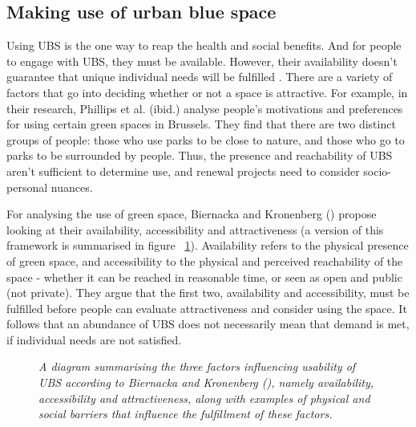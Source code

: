 \documentclass{article}
\begin{document}
\subsection{Making use of urban blue space}

Using UBS is the one way to reap the health and social benefits. And for people to engage with UBS, they must be available. However, their availability doesn't guarantee that unique individual needs will be fulfilled \parencite{phillips2021use}. There are a variety of factors that go into deciding whether or not a space is attractive. For example, in their research, Phillips et al. (ibid.) analyse people's motivations and preferences for using certain green spaces in Brussels. They find that there are two distinct groups of people: those who use parks to be close to nature, and those who go to parks to be surrounded by people. Thus, the presence and reachability of UBS aren't sufficient to determine use, and renewal projects need to consider socio-personal nuances.

For analysing the use of green space, Biernacka and Kronenberg (\citeyear{biernacka2018classification}) propose looking at their availability, accessibility and attractiveness (a version of this framework is summarised in figure ~\ref{fig:diagram_ubs_use}).
Availability refers to the physical presence of green space, and accessibility to the physical and perceived reachability of the space - whether it can be reached in reasonable time, or seen as open and public (not private). 
They argue that the first two, availability and accessibility, must be fulfilled before people can evaluate attractiveness and consider using the space. 
It follows that an abundance of UBS does not necessarily mean that demand is met, if individual needs are not satisfied.

\begin{figure}[h]
	\caption{\textit{A diagram summarising the three factors influencing usability of UBS according to Biernacka and Kronenberg (\citeyear{biernacka2018classification}), namely availability, accessibility and attractiveness, along with examples of physical and social barriers that influence the fulfillment of these factors.}}
	  \label{fig:diagram_ubs_use}
\end{figure}
\end{document}
